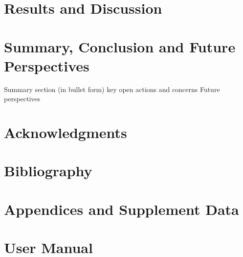 \documentclass[a4paper, 10pt]{article}
\begin{document}
\section{Results and Discussion}


\section{Summary, Conclusion and Future Perspectives}
Summary section (in bullet form)
key open actions and concerns
Future perspectives 

\section{Acknowledgments}

\section{Bibliography} 

\section{Appendices and Supplement Data}  

\section{User Manual}
\end{document}
